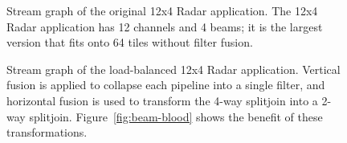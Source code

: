\begin{figure}[t]
\vspace{-.5in}
\centering
\begin{minipage}{3.0in}
\centering
{}
\caption{\protect\small Stream graph of the original 12x4 Radar
application.  The 12x4 Radar application has 12 channels and 4 beams;
it is the largest version that fits onto 64 tiles without filter
fusion.  \protect\label{fig:beam-orig}}
\end{minipage}
\hspace{0.1in}
\begin{minipage}{3.0in}
\centering
{}
\caption{\protect\small Stream graph of the load-balanced 12x4
Radar application.  Vertical fusion is applied to collapse each pipeline
into a single filter, and horizontal fusion is used to transform the
4-way splitjoin into a 2-way splitjoin.  Figure~\ref{fig:beam-blood}
shows the benefit of these
transformations. \protect\label{fig:beam-opt}}
\end{minipage}
\end{figure}


